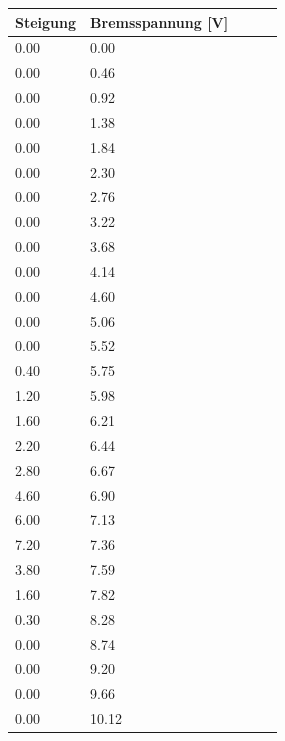 \begin{minipage}{\linewidth}
    \begin{table}[H]
        \centering
    \begin{tabular}{lllll}
        \toprule
        Steigung & Bremsspannung [V]\\
        \midrule
        0.00  &  0.00  \\        
        0.00  &  0.46  \\        
        0.00  &  0.92  \\        
        0.00  &  1.38  \\        
        0.00  &  1.84  \\        
        0.00  &  2.30  \\        
        0.00  &  2.76  \\        
        0.00  &  3.22  \\        
        0.00  &  3.68  \\        
        0.00  &  4.14  \\        
        0.00  &  4.60  \\        
        0.00  &  5.06  \\        
        0.00  &  5.52  \\        
        0.40  &  5.75  \\        
        1.20  &  5.98  \\        
        1.60  &  6.21  \\        
        2.20  &  6.44  \\        
        2.80  &  6.67  \\
        4.60  &  6.90  \\
        6.00  &  7.13  \\
        7.20  &  7.36  \\
        3.80  &  7.59  \\
        1.60  &  7.82  \\
        0.30  &  8.28  \\
        0.00  &  8.74  \\
        0.00  &  9.20  \\
        0.00  &  9.66  \\
        0.00  &  10.12  \\
        \bottomrule
        
    \end{tabular}
    
    \label{tab:3}
    \end{table}
    \end{minipage}

